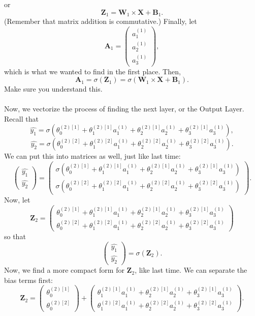 \documentclass{article}
\begin{document}
or 
\[\textbf{Z}_1=\textbf{W}_1\times \textbf{X}+\textbf{B}_1.\]
(Remember that matrix addition is commutative.) Finally, let 
\[\textbf{A}_1=\begin{pmatrix}
a_1^{(1)}\\
a_2^{(1)}\\
a_3^{(1)}
\end{pmatrix},\]
which is what we wanted to find in the first place. Then, 
\[\textbf{A}_1=\sigma(\textbf{Z}_1)=\sigma(\textbf{W}_1\times \textbf{X}+\textbf{B}_1).\]
Make sure you understand this.
\\
\\
Now, we vectorize the process of finding the next layer, or the Output Layer. Recall that 
\[\hat{y_1}=\sigma(\theta_0^{(2)[1]}+\theta_1^{(2)[1]}a^{(1)}_1+\theta_2^{(2)[1]}a^{(1)}_2+\theta_3^{(2)[1]}a^{(1)}_3),\]
\[\hat{y_2}=\sigma(\theta_0^{(2)[2]}+\theta_1^{(2)[2]}a^{(1)}_1+\theta_2^{(2)[2]}a^{(1)}_2+\theta_3^{(2)[2]}a^{(1)}_3).\]
We can put this into matrices as well, just like last time:
\[\begin{pmatrix}
\hat{y_1}\\
\hat{y_2}
\end{pmatrix}=\begin{pmatrix}
\sigma(\theta_0^{(2)[1]}+\theta_1^{(2)[1]}a^{(1)}_1+\theta_2^{(2)[1]}a^{(1)}_2+\theta_3^{(2)[1]}a^{(1)}_3)\\
\sigma(\theta_0^{(2)[2]}+\theta_1^{(2)[2]}a^{(1)}_1+\theta_2^{(2)[2]}a^{(1)}_2+\theta_3^{(2)[2]}a^{(1)}_3)
\end{pmatrix}.\]
Now, let 
\[\textbf{Z}_2=\begin{pmatrix}
\theta_0^{(2)[1]}+\theta_1^{(2)[1]}a^{(1)}_1+\theta_2^{(2)[1]}a^{(1)}_2+\theta_3^{(2)[1]}a^{(1)}_3\\
\theta_0^{(2)[2]}+\theta_1^{(2)[2]}a^{(1)}_1+\theta_2^{(2)[2]}a^{(1)}_2+\theta_3^{(2)[2]}a^{(1)}_3
\end{pmatrix}\]
so that 
\[\begin{pmatrix}
\hat{y_1}\\
\hat{y_2}
\end{pmatrix}=\sigma(\textbf{Z}_2).\]
Now, we find a more compact form for $\textbf{Z}_2$, like last time. We can separate the bias terms first: 
\[\textbf{Z}_2=\begin{pmatrix}
\theta_0^{(2)[1]}\\
\theta_0^{(2)[2]}
\end{pmatrix}+\begin{pmatrix}
\theta_1^{(2)[1]}a^{(1)}_1+\theta_2^{(2)[1]}a^{(1)}_2+\theta_3^{(2)[1]}a^{(1)}_3\\
\theta_1^{(2)[2]}a^{(1)}_1+\theta_2^{(2)[2]}a^{(1)}_2+\theta_3^{(2)[2]}a^{(1)}_3
\end{pmatrix}.\]
\end{document}
